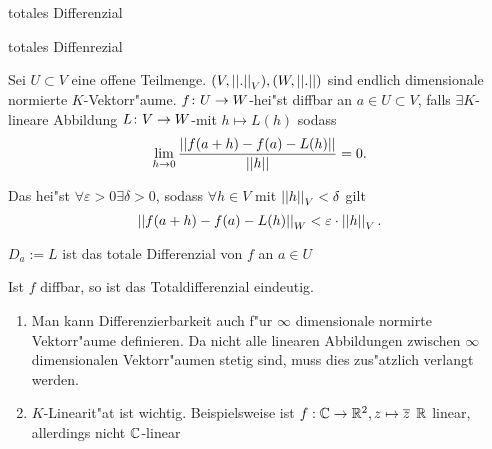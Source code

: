 \documentclass[class=article, crop=false]{standalone}
\begin{document}
\begin{zettel}{totales Differenzial}
\begin{flashcard}
\begin{question}
totales Diffenrezial
\end{question}
\begin{definition}
        Sei $U \subset  V$ eine offene Teilmenge. $(V,\left|\left|.\right|\right|_V), (W,\left|\left|.\right|\right|)$ sind endlich dimensionale normierte $K$-Vektorr"aume. $f \colon U\to W$-hei"st diffbar an $a \in  U \subset  V$, falls $\exists  K$-lineare Abbildung $L \colon V\to W$-mit $h \mapsto L (h)$ sodass
\[
    \lim_{h \to 0} \frac{ \left|\left|f (a+h)- f (a)- L (h)\right|\right|}{ \left|\left|h\right|\right|} =0
.\]

Das hei"st $\forall\varepsilon>0 \exists\delta>0$, sodass $\forall h \in V$ mit $\left|\left|h\right|\right|_V < \delta$ gilt
\[
 \left|\left| f (a +h) - f (a)- L (h)\right|\right|_W < \varepsilon \cdot  \left|\left|h\right|\right|_V
.\]

$D_a := L $ ist das totale Differenzial von $f$  an $a \in  U$ 
\end{definition}
\end{flashcard}

\begin{remark}
Ist $f$ diffbar, so ist das Totaldifferenzial eindeutig.
\end{remark}

\begin{remark}
\begin{enumerate}
    \item Man kann Differenzierbarkeit auch f"ur $\infty$ dimensionale normirte Vektorr"aume definieren. Da nicht alle linearen Abbildungen zwischen $\infty$ dimensionalen Vektorr"aumen stetig sind, muss dies zus"atzlich verlangt werden.
    \item $K$-Linearit"at ist wichtig. Beispielsweise ist $f: \mathbb{C} \to \mathbb{R}^2, z \mapsto \overline{z}$ $\mathbb{R} $ linear, allerdings nicht $\mathbb{C} $-linear
\end{enumerate}
\end{remark}

\end{zettel}
\end{document}
